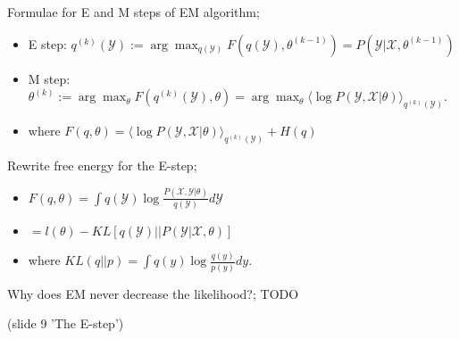 \documentclass{article}
\begin{document}
Formulae for E and M steps of EM algorithm; \begin{itemize}
	\item E step: $q^{(k)}(\mathcal{Y}):=\arg\max_{q(\mathcal{Y})}  F(q(\mathcal{Y}),\theta^{(k-1)}) = P(\mathcal{Y}|\mathcal{X},\theta^{(k-1)})$
	\item M step: $\theta^{(k)}:=\arg\max_\theta F(q^{(k)}(\mathcal{Y}),\theta)=\arg\max_{\theta}\langle \log P(\mathcal{Y}, \mathcal{X}|\theta)\rangle_{q^{(k)}(\mathcal{Y})}$.
	\item where $F(q,\theta)=\langle \log P(\mathcal{Y}, \mathcal{X}|\theta)\rangle_{q^{(k)}(\mathcal{Y})}+H(q)$
\end{itemize}

Rewrite free energy for the E-step; \begin{itemize}
	\item $F(q,\theta) = \int q(\mathcal{Y})\log \frac{P(\mathcal{X, Y}|\theta)}{q(\mathcal{Y})}d\mathcal{Y}$
	\item $= l(\theta) - KL[q(\mathcal{Y})||P(\mathcal{Y}|\mathcal{X},\theta)]$
	\item where $KL(q||p) = \int q(y)\log\frac{q(y)}{p(y)}dy$.
\end{itemize}

Why does EM never decrease the likelihood?; TODO 

(slide 9 'The E-step')
\end{document}

